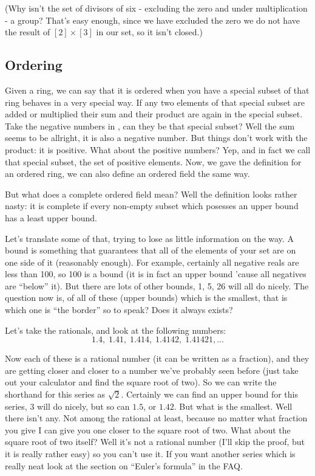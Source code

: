 (Why isn't the set of divisors of six - excluding the zero and under 
multiplication - a group?  That's easy enough, since we have excluded
the
zero we do not have the result of $[2] \times [3]$ in our set, so it
isn't
closed.)

\subsection{Ordering}

Given a ring, we can say that it is ordered when you have a special
subset
of that ring behaves in a very special way. If any two elements of that
special subset are added or multiplied their sum and their product are
again
in the special subset. Take the negative numbers in \R{}, can they be
that special subset? Well the sum seems to be allright, it is also a
negative 
number. But things don't work with the product: it is positive. What
about
the positive numbers? Yep, and in fact we call that special subset, the
set of positive elements. Now, we gave the definition for an ordered
ring, 
we can also define an ordered field the same way.

But what does a complete ordered field mean? Well the definition looks
rather nasty: it is complete if every non-empty subset which posesses
an upper bound has a least upper bound.

Let's translate some of that, trying to lose as little information on
the
way. A bound is something that guarantees that all of the elements of
your
set are on one side of it (reasonably enough). For example, certainly
all 
negative reals are less than 100, so 100 is a bound (it is in fact an
upper
bound 'cause all negatives are ``below'' it). But there are lots
of other bounds, 1, 5, 26 will all do nicely. The question now is, of
all of these (upper bounds) which is the smallest, that is which one is
``the
border'' so to speak? Does it always exists?

Let's take the rationals, and look at the following numbers:
\[1.4, \; 1.41, \; 1.414, \; 1.4142, \; 1.41421, \ldots \]

Now each of these is a rational number (it can be written as a
fraction),
and they are getting closer and closer to a number we've probably seen
before (just take out your calculator and find the square root of two).
So we can write the shorthand for this series as $\sqrt{2}$.
Certainly we can find an upper bound for this series, $3$ will do
nicely,
but so can $1.5$, or $1.42$. But what is the smallest. Well there isn't
any. Not among the rational at least, because no matter what fraction
you give I can give you one closer to the square root of two. What
about the square root of two itself? Well it's not a rational number
(I'll skip the proof, but it is really rather easy) so you can't use
it. 
If you want another series which is really neat look at the section on
``Euler's formula'' in the FAQ.

